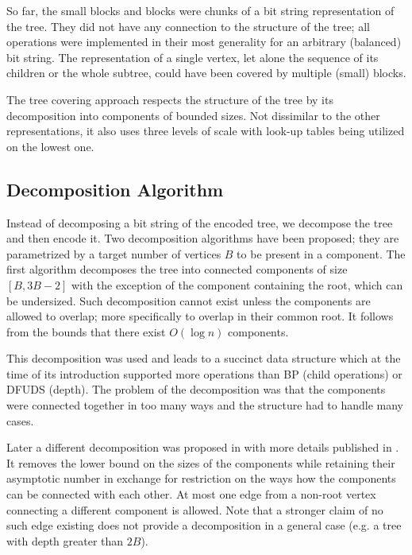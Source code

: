 So far, the small blocks and blocks were chunks of a bit string representation of the tree.
They did not have any connection to the structure of the tree; all operations were implemented in their most generality for an arbitrary (balanced) bit string.
The representation of a single vertex, let alone the sequence of its children or the whole subtree, could have been covered by multiple (small) blocks.

The tree covering approach respects the structure of the tree by its decomposition into components of bounded sizes.
Not dissimilar to the other representations, it also uses three levels of scale with look-up tables being utilized on the lowest one.

\subsection{Decomposition Algorithm}

Instead of decomposing a bit string of the encoded tree, we decompose the tree and then encode it.
Two decomposition algorithms have been proposed; they are parametrized by a target number of vertices $B$ to be present in a component.
The first algorithm \cite{geary2006succinct} decomposes the tree into connected components of size $[B, 3 B - 2]$ with the exception of the component containing the root, which can be undersized.
Such decomposition cannot exist unless the components are allowed to overlap; more specifically to overlap in their common root.
It follows from the bounds that there exist $O(\log n)$ components.

This decomposition was used and leads to a succinct data structure which at the time of its introduction supported more operations than BP (child operations) or DFUDS (depth).
The problem of the decomposition was that the components were connected together in too many ways and the structure had to handle many cases.

Later a different decomposition was proposed in \cite{farzan2008uniform} with more details published in \cite{farzan2014uniform}.
It removes the lower bound on the sizes of the components while retaining their asymptotic number in exchange for restriction on the ways how the components can be connected with each other.
At most one edge from a non-root vertex connecting a different component is allowed.
Note that a stronger claim of no such edge existing does not provide a decomposition in a general case (e.g. a tree with depth greater than $2 B$).

\bigbreak

